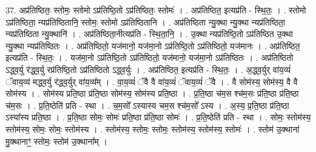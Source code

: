 \documentclass[17pt]{extarticle}
\begin{document}
37. अप्र॑तिष्ठितः॒ स्तोमः॒ स्तोमो ऽप्र॑तिष्ठि॒तो ऽप्र॑तिष्ठितः॒ स्तोमः॑ । . अप्र॑तिष्ठित॒ इत्यप्र॑ति - स्थि॒तः॒ । . स्तोमो ऽप्र॑तिष्ठिता॒ न्यप्र॑तिष्ठितानि॒ स्तोमः॒ स्तोमो ऽप्र॑तिष्ठितानि । . अप्र॑तिष्ठिता न्यु॒क्था न्यु॒क्था न्यप्र॑तिष्ठिता॒ न्यप्र॑तिष्ठिता न्यु॒क्थानि॑ । . अप्र॑तिष्ठिता॒नीत्यप्र॑ति - स्थि॒ता॒नि॒ । . उ॒क्था न्यप्र॑तिष्ठि॒तो ऽप्र॑तिष्ठित उ॒क्था न्यु॒क्था न्यप्र॑तिष्ठितः । . अप्र॑तिष्ठितो॒ यज॑मानो॒ यज॑मा॒नो ऽप्र॑तिष्ठि॒तो ऽप्र॑तिष्ठितो॒ यज॑मानः । . अप्र॑तिष्ठित॒ इत्यप्र॑ति - स्थि॒तः॒ । . यज॑मा॒नो ऽप्र॑तिष्ठि॒तो ऽप्र॑तिष्ठितो॒ यज॑मानो॒ यज॑मा॒नो ऽप्र॑तिष्ठितः । . अप्र॑तिष्ठितो ऽद्ध्व॒र्यु र॑द्ध्व॒र्यु रप्र॑तिष्ठि॒तो ऽप्र॑तिष्ठितो ऽद्ध्व॒र्युः । . अप्र॑तिष्ठित॒ इत्यप्र॑ति - स्थि॒तः॒ । . अ॒द्ध्व॒र्युर् वा॑य॒व्यं॑ ॅवाय॒व्य॑ मद्ध्व॒र्यु र॑द्ध्व॒र्युर् वा॑य॒व्य᳚म् । . वा॒य॒व्यं॑ ॅवै वै वा॑य॒व्यं॑ ॅवाय॒व्यं॑ ॅवै । . वै सोम॑स्य॒ सोम॑स्य॒ वै वै सोम॑स्य । . सोम॑स्य प्रति॒ष्ठा प्र॑ति॒ष्ठा सोम॑स्य॒ सोम॑स्य प्रति॒ष्ठा । . प्र॒ति॒ष्ठा च॑म॒स श्च॑म॒सः प्र॑ति॒ष्ठा प्र॑ति॒ष्ठा च॑म॒सः । . प्र॒ति॒ष्ठेति॑ प्रति - स्था । . च॒म॒सो᳚ ऽस्यास्य चम॒स श्च॑म॒सो᳚ ऽस्य । . अ॒स्य॒ प्र॒ति॒ष्ठा प्र॑ति॒ष्ठा ऽस्या᳚स्य प्रति॒ष्ठा । . प्र॒ति॒ष्ठा सोमः॒ सोमः॑ प्रति॒ष्ठा प्र॑ति॒ष्ठा सोमः॑ । . प्र॒ति॒ष्ठेति॑ प्रति - स्था । . सोमः॒ स्तोम॑स्य॒ स्तोम॑स्य॒ सोमः॒ सोमः॒ स्तोम॑स्य । . स्तोम॑स्य॒ स्तोमः॒ स्तोमः॒ स्तोम॑स्य॒ स्तोम॑स्य॒ स्तोमः॑ । . स्तोम॑ उ॒क्थाना॑ मु॒क्थानाꣳ॒॒ स्तोमः॒ स्तोम॑ उ॒क्थाना᳚म् । \newline
\end{document}
